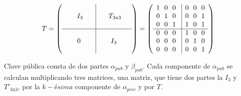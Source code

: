 \begin{equation}\label{eq:ej-T}
{T} =
	\left(\begin{array}{c|c}
	\\
	\ \ \ \ \ I_3\ \ \ \ & \ \ \ \ T_{3\mathrm{x}3} \ \ \  \\
	\\
	\hline
	\\
	0 & I_3\\
	\\
	\end{array}\right) =
	\left(\begin{array}{c|c}
		1\ \ 0\ \ 0\ & 0\ \ 0\ \ 0\\
		0\ \ 1\ \ 0\ & 0\ \ 0\ \ 1\\
		0\ \ 0\ \ 1\ & 1\ \ 0\ \ 1\\
		\hline
		0\ \ 0\ \ 0\ & 1\ \ 0\ \ 0\\
		0\ \ 0\ \ 0\ & 0\ \ 1\ \ 0\\
		0\ \ 0\ \ 0\ & 0\ \ 0\ \ 1
	\end{array}\right)
\end{equation}


Clave pública consta de dos partes $\alpha_{pub}$ y $\beta_{pub}$. Cada  componente de $\alpha_{pub}$ se calculan multiplicando tres matrices, una matriz, que tiene dos partes la $I_3$ y $T'_{3\mathrm{x}3}$, por la $k-ésima$ componente de $\alpha_{priv}$ y por $T$.

